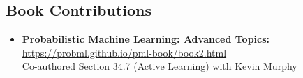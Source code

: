 \documentclass[letter,10pt]{article}
\begin{document}
\subsection*{\sc \textbf{Book Contributions}\hspace{5pt}\noindent\hrulefill}

\begin{itemize}
        \item \textbf{Probabilistic Machine Learning: Advanced Topics: }\href{https://probml.github.io/pml-book/book2.html}{https://probml.github.io/pml-book/book2.html}\\
        Co-authored Section 34.7 (Active Learning) with Kevin Murphy
        

\end{itemize}
\end{document}
